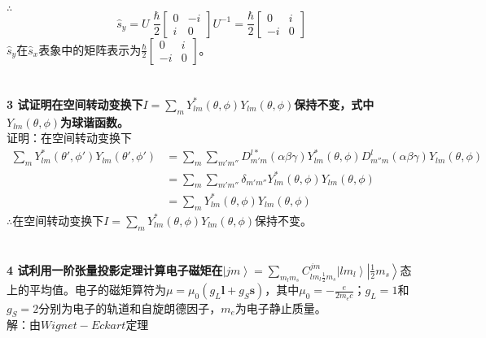 \documentclass[12pt]{article}
\numberwithin{equation}{section}	 %
\begin{document}
\begin{spacing}{1.5}
~\\
$\therefore$
\begin{equation}
\hat{s}_{y} = U \;\frac{\hbar}{2} \begin{bmatrix} 0 & -i \\ i & 0 \end{bmatrix}U^{-1} = \frac{\hbar}{2} \begin{bmatrix} 0 & i \\ -i & 0 \end{bmatrix}
\end{equation}
$\hat{s}_{y}$在$\hat{s}_{x}$表象中的矩阵表示为$\displaystyle \frac{\hbar}{2} \begin{bmatrix} 0 & i \\ -i & 0 \end{bmatrix}$。\\
~\\
~\\
\textbf{3 \quad 试证明在空间转动变换下$\displaystyle I=\sum_{m} Y^{*}_{lm}(\theta,\phi)Y_{lm}(\theta,\phi)$保持不变，式中$Y_{lm}(\theta,\phi)$为球谐函数。}\\
证明：在空间转动变换下\\
\begin{equation}\nonumber 		%
\begin{aligned}
\sum_{m} Y^{*}_{lm}(\theta',\phi')Y_{lm}(\theta',\phi') &= \sum_{m}\sum_{m'm''}D^{l*}_{m'm}(\alpha\beta\gamma)Y^{*}_{lm}(\theta,\phi)D^{l}_{m''m}(\alpha\beta\gamma)Y_{lm}(\theta,\phi)\\
&= \sum_{m}\sum_{m'm''}\delta_{m'm''}Y^{*}_{lm}(\theta,\phi)Y_{lm}(\theta,\phi)\\
&= \sum_{m} Y^{*}_{lm}(\theta,\phi)Y_{lm}(\theta,\phi)
\end{aligned}
\end{equation}
$\therefore$在空间转动变换下$\displaystyle I=\sum_{m} Y^{*}_{lm}(\theta,\phi)Y_{lm}(\theta,\phi)$保持不变。\\
~\\
~\\
\textbf{4 \quad 试利用一阶张量投影定理计算电子磁矩在$\left|jm\right>={\displaystyle\sum\limits_{m_{l}m_{s}}C^{jm}_{lm_{l}\frac{1}{2}m_{s}}}\left|lm_{l}\right>\left|\frac{1}{2}m_{s}\right>$}态上的平均值。电子的磁矩算符为$\mu=\mu_{0}(g_{L}\bm{l}+g_{S}\bm{s})$，其中$\displaystyle \mu_{0}=-\frac{e}{2m_{e}c}$；$g_{L}=1$和$g_{S}=2$分别为电子的轨道和自旋朗德因子，$m_{e}$为电子静止质量。\\
解：由$Wignet-Eckart$定理
\begin{equation}

\end{equation}
\end{spacing}
\end{document}
